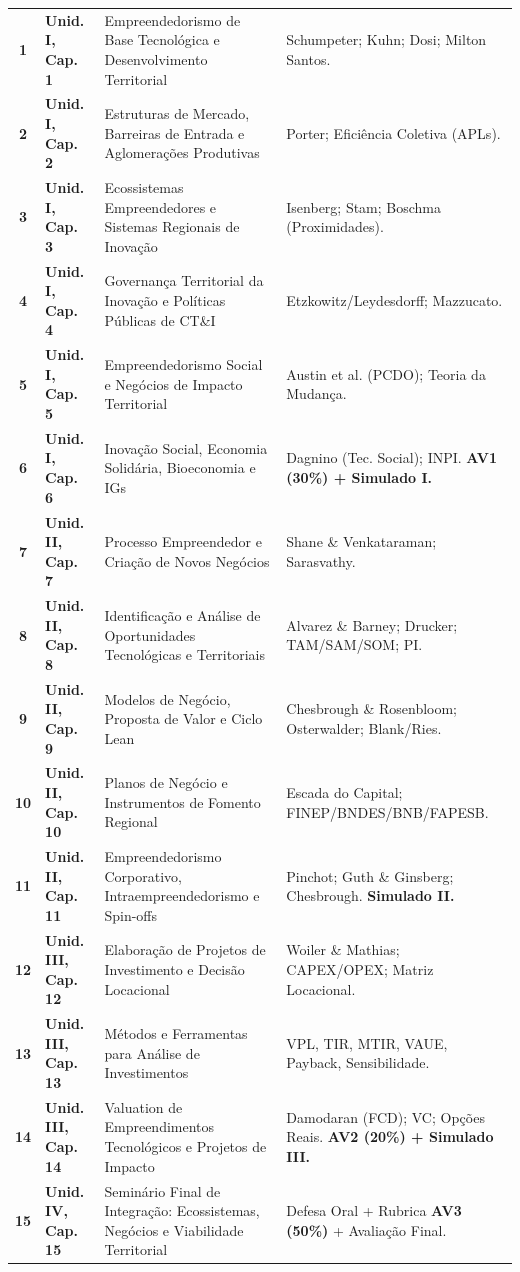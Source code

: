 \begin{longtable}{@{}c p{2.8cm} p{5.7cm} p{4.3cm}@{}}
  \textbf{1} & \textbf{Unid. I, Cap. 1} & Empreendedorismo de Base Tecnológica e Desenvolvimento Territorial & Schumpeter; Kuhn; Dosi; Milton Santos. \\
  \rowcolor{bgGray}
  \textbf{2} & \textbf{Unid. I, Cap. 2} & Estruturas de Mercado, Barreiras de Entrada e Aglomerações Produtivas & Porter; Eficiência Coletiva (APLs). \\
  \textbf{3} & \textbf{Unid. I, Cap. 3} & Ecossistemas Empreendedores e Sistemas Regionais de Inovação & Isenberg; Stam; Boschma (Proximidades). \\
  \rowcolor{bgGray}
  \textbf{4} & \textbf{Unid. I, Cap. 4} & Governança Territorial da Inovação e Políticas Públicas de CT\&I & Etzkowitz/Leydesdorff; Mazzucato. \\
  \textbf{5} & \textbf{Unid. I, Cap. 5} & Empreendedorismo Social e Negócios de Impacto Territorial & Austin et al. (PCDO); Teoria da Mudança. \\
  \rowcolor{bgTeal}
  \textbf{6} & \textbf{Unid. I, Cap. 6} & Inovação Social, Economia Solidária, Bioeconomia e IGs & Dagnino (Tec. Social); INPI. \textbf{\color{etAlert}AV1 (30\%) + Simulado I.} \\
  \midrule
  \textbf{7} & \textbf{Unid. II, Cap. 7} & Processo Empreendedor e Criação de Novos Negócios & Shane \& Venkataraman; Sarasvathy. \\
  \rowcolor{bgGray}
  \textbf{8} & \textbf{Unid. II, Cap. 8} & Identificação e Análise de Oportunidades Tecnológicas e Territoriais & Alvarez \& Barney; Drucker; TAM/SAM/SOM; PI. \\
  \textbf{9} & \textbf{Unid. II, Cap. 9} & Modelos de Negócio, Proposta de Valor e Ciclo Lean & Chesbrough \& Rosenbloom; Osterwalder; Blank/Ries. \\
  \rowcolor{bgGray}
  \textbf{10} & \textbf{Unid. II, Cap. 10} & Planos de Negócio e Instrumentos de Fomento Regional & Escada do Capital; FINEP/BNDES/BNB/FAPESB. \\
  \textbf{11} & \textbf{Unid. II, Cap. 11} & Empreendedorismo Corporativo, Intraempreendedorismo e Spin-offs & Pinchot; Guth \& Ginsberg; Chesbrough. \textbf{Simulado II.} \\
  \midrule
  \textbf{12} & \textbf{Unid. III, Cap. 12} & Elaboração de Projetos de Investimento e Decisão Locacional & Woiler \& Mathias; CAPEX/OPEX; Matriz Locacional. \\
  \rowcolor{bgGray}
  \textbf{13} & \textbf{Unid. III, Cap. 13} & Métodos e Ferramentas para Análise de Investimentos & VPL, TIR, MTIR, VAUE, Payback, Sensibilidade. \\
  \textbf{14} & \textbf{Unid. III, Cap. 14} & Valuation de Empreendimentos Tecnológicos e Projetos de Impacto & Damodaran (FCD); VC; Opções Reais. \textbf{\color{etAlert}AV2 (20\%) + Simulado III.} \\
  \midrule
  \rowcolor{bgAmber}
  \textbf{15} & \textbf{Unid. IV, Cap. 15} & Seminário Final de Integração: Ecossistemas, Negócios e Viabilidade Territorial & Defesa Oral + Rubrica \textbf{\color{etAlert}AV3 (50\%)} + Avaliação Final. \\
\end{longtable}
\normalsize
